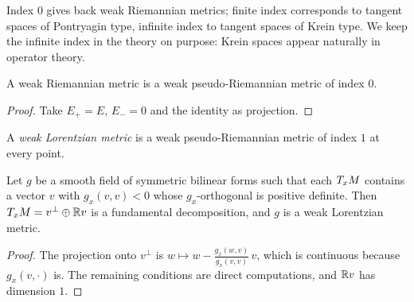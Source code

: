 Index $0$ gives back weak Riemannian metrics; finite index corresponds to tangent spaces of
Pontryagin type, infinite index to tangent spaces of Krein type. We keep the infinite index in the
theory on purpose: Krein spaces appear naturally in operator theory.

\begin{proposition}
  \label{prop:mt-riemannian-index}
  \leanok
  A weak Riemannian metric is a weak pseudo-Riemannian metric of index $0$.
\end{proposition}

\begin{proof}
  \leanok
  Take $E_+ = E$, $E_- = 0$ and the identity as projection.
\end{proof}

\begin{definition}
  \label{def:weak-lorentzian}
  \leanok
  A \emph{weak Lorentzian metric} is a weak pseudo-Riemannian metric of index $1$ at every point.
\end{definition}

\begin{theorem}
  \label{thm:mt-timelike}
  \leanok
  Let $g$ be a smooth field of symmetric bilinear forms such that each $T_x M$ contains a vector $v$
  with $g_x(v,v) < 0$ whose $g_x$-orthogonal is positive definite. Then $T_x M = v^\perp \oplus \mathbb{R} v$
  is a fundamental decomposition, and $g$ is a weak Lorentzian metric.
\end{theorem}

\begin{proof}
  \leanok
  The projection onto $v^\perp$ is $w \mapsto w - \frac{g_x(w, v)}{g_x(v, v)}\, v$, which is
  continuous because $g_x(v, \cdot)$ is. The remaining conditions are direct computations, and
  $\mathbb{R} v$ has dimension $1$.
\end{proof}

